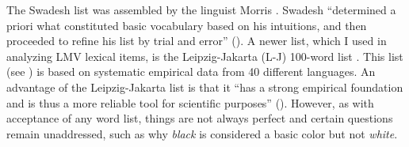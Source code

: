 \documentclass[output=paper]{LSP/langsci}
\begin{document}
	The Swadesh list was assembled by the linguist Morris \citet{Swadesh1971}. Swadesh “determined a priori what constituted basic vocabulary based on his intuitions, and then proceeded to refine his list by trial and error” (\citealt[230]{Tadmoretal2010}). A newer list, which I used in analyzing LMV lexical items, is the Leipzig-Jakarta (L-J) 100-word list \citep{HaspelmathTadmor2009}. This list (see ) is based on systematic empirical data from 40 different languages. An advantage of the Leipzig-Jakarta list is that it ``has a strong empirical foundation and is thus a more reliable tool for scientific purposes” (\citealt[230]{Tadmoretal2010}). However, as with acceptance of any word list, things are not always perfect and certain questions remain unaddressed, such as why \emph{black} is considered a basic color but not \emph{white}.
\end{document}
